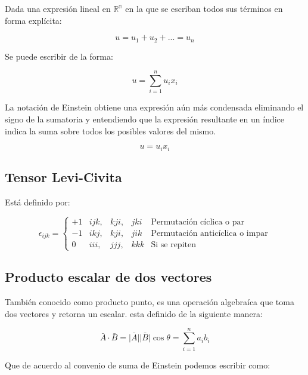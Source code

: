 \documentclass{article}
\providecommand{\abs}[1]{\lvert#1\rvert}
\begin{document}
Dada una expresión lineal en 
$\mathbb{R^n}$ en la que se escriban todos sus términos en forma explícita:

\begin{equation}
    u = u_1 + u_2 + ... = u_n
\end{equation}

Se puede escribir de la forma:

\begin{equation}
    u = \sum_{i=1}^{n} u_ix_i
\end{equation}

La notación de Einstein obtiene una expresión aún más condensada eliminando el
signo de la sumatoria y entendiendo que la expresión resultante en un índice
indica la suma sobre todos los posibles valores del mismo.

\begin{equation}
    u = u_ix_i
\end{equation}

\subsection{Tensor Levi-Civita}
Está definido por:

\begin{equation}
    \epsilon_{ijk}=
    \left\lbrace\begin{array}{clllr} 
        +1 & ijk, & kji, & jki & \text{Permutación cíclica o par}\\ 
        -1 & ikj, & kji, & jik & \text{Permutación anticíclica o impar}\\
        0  & iii, & jjj, & kkk & \text{Si se repiten}
    \end{array}\right.
\end{equation}

\subsection{Producto escalar de dos vectores}

También conocido como producto punto, es una operación algebraíca que toma dos
vectores y retorna un escalar. esta definido de la siguiente manera:

\begin{equation}
    \bar{A} \cdot \bar{B}= \bar{\abs{A}} \bar{\abs{B}} \cos \theta
    = \sum_{i=1}^{n} a_i b_i
\end{equation}

Que de acuerdo al convenio de suma de Einstein podemos escribir como:
\end{document}
